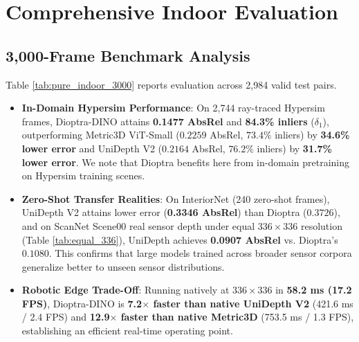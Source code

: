 \documentclass[10pt,twocolumn,letterpaper]{article}
\begin{document}
\section{Comprehensive Indoor Evaluation}

\subsection{3,000-Frame Benchmark Analysis}
Table \ref{tab:pure_indoor_3000} reports evaluation across 2,984 valid test pairs. 
\begin{itemize}
    \item \textbf{In-Domain Hypersim Performance}: On 2,744 ray-traced Hypersim frames, Dioptra-DINO attains \textbf{0.1477 AbsRel} and \textbf{84.3\% inliers} ($\delta_1$), outperforming Metric3D ViT-Small ($0.2259$ AbsRel, $73.4\%$ inliers) by \textbf{34.6\% lower error} and UniDepth V2 ($0.2164$ AbsRel, $76.2\%$ inliers) by \textbf{31.7\% lower error}. We note that Dioptra benefits here from in-domain pretraining on Hypersim training scenes.
    \item \textbf{Zero-Shot Transfer Realities}: On InteriorNet (240 zero-shot frames), UniDepth V2 attains lower error (\textbf{0.3346 AbsRel}) than Dioptra ($0.3726$), and on ScanNet Scene00 real sensor depth under equal $336 \times 336$ resolution (Table \ref{tab:equal_336}), UniDepth achieves \textbf{0.0907 AbsRel} vs. Dioptra's $0.1080$. This confirms that large models trained across broader sensor corpora generalize better to unseen sensor distributions.
    \item \textbf{Robotic Edge Trade-Off}: Running natively at $336 \times 336$ in \textbf{58.2 ms (17.2 FPS)}, Dioptra-DINO is \textbf{7.2$\times$ faster than native UniDepth V2} (421.6 ms / 2.4 FPS) and \textbf{12.9$\times$ faster than native Metric3D} (753.5 ms / 1.3 FPS), establishing an efficient real-time operating point.
\end{itemize}
\end{document}
